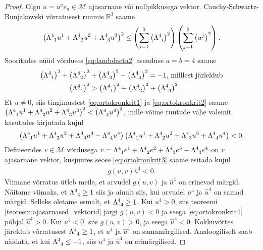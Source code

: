 \documentclass[a4paper,12pt]{article}
\theoremstyle{plain}
\theoremstyle{definition}
\numberwithin{equation}{section}
\begin{document}
\begin{proof}
Olgu $u = u^a e_a \in \mathcal{M}$ ajasarnane või nullpikkusega vektor. Cauchy-Schwartz-Bunjakowski võrratusest ruumis $\mathbb{R}^{3}$ saame
\begin{align} \label{eq:ortokronkrit1}
\left(\Lambda\indices{^4_1} u^1 + \Lambda\indices{^4_2} u^2 + \Lambda\indices{^4_3} u^3\right)^2 \leq \left(\sum_{i = 1}^{3} \left(\Lambda\indices{^4_i}\right)^2 \right) \left(\sum_{j = 1}^{3} \left(u^j\right)^2 \right).
\end{align}
Sooritades nüüd võrduses \ref{eq:lambdaeta2} asenduse $a = b = 4$ saame
\begin{align} \label{eq:ortokronkrit2}
\left(\Lambda\indices{^4_1}\right)^2 + \left(\Lambda\indices{^4_2}\right)^2 &+ \left(\Lambda\indices{^4_3}\right)^2 - \left(\Lambda\indices{^4_4}\right)^2 = -1 \text{, milllest järleldub} \nonumber \\
\left(\Lambda\indices{^4_4}\right)^2 &> \left(\Lambda\indices{^4_1}\right)^2 + \left(\Lambda\indices{^4_2}\right)^2 + \left(\Lambda\indices{^4_3}\right)^2.
\end{align}
Et $u \neq 0$, siis tingimustest \ref{eq:ortokronkrit1} ja \ref{eq:ortokronkrit2} saame $\left(\Lambda\indices{^4_1} u^1 + \Lambda\indices{^4_2} u^2 + \Lambda\indices{^4_3} u^3\right)^2 < \left(\Lambda\indices{^4_4} u^4\right)^2$, mille võime ruutude vahe valemit kasutades kirjutada kujul
\begin{align} \label{eq:ortokronkrit3}
\left(\Lambda\indices{^4_1} u^1 + \Lambda\indices{^4_2} u^2 + \Lambda\indices{^4_3} u^3 - \Lambda\indices{^4_4} u^4\right)\left(\Lambda\indices{^4_1} u^1 + \Lambda\indices{^4_2} u^2 + \Lambda\indices{^4_3} u^3 + \Lambda\indices{^4_4} u^4\right) < 0.
\end{align}
Defineerides $v \in \mathcal{M}$ võrdusega $v = \Lambda\indices{^4_1} e^1 + \Lambda\indices{^4_2} e^2 + \Lambda\indices{^4_3} e^3 - \Lambda\indices{^4_4} e^4$ on $v$ ajasarnane vektor, kusjuures seose \ref{eq:ortokronkrit3} saame esitada kujul
\begin{align} \label{eq:ortokronkrit4}
g\left(u , v\right)\hat{u}^4 < 0.
\end{align}
Viimane võrratus ütleb meile, et arvudel $g\left(u,v\right)$ ja $\hat{u}^4$ on erinevad märgid.
Näitame viimaks, et $\Lambda\indices{^4_4} \geq 1$ siis ja ainult siis, kui arvudel $u^4$ ja $\hat{u}^4$ on samad märgid.
Selleks oletame esmalt, et $\Lambda\indices{^4_4} \geq 1$. Kui $u^4 > 0$, siis teoreemi \ref{teoreem:ajasarnased_vektorid} järgi $g\left(u, v\right) < 0$ ja seega \ref{eq:ortokronkrit4} põhjal $\hat{u}^4 >0$. Kui $u^4 < 0$, siis $g\left(u, v\right) > 0$, ja seega $\hat{u}^4 < 0$. Kokkuvõttes järeldub võrratusest $\Lambda\indices{^4_4} \geq 1$, et $u^4$ ja $\hat{u}^4$ on samamärgilised. Analoogiliselt saab näidata, et kui $\Lambda\indices{^4_4} \leq -1$, siis $u^4$ ja $\hat{u}^4$ on erimärgilised.
\end{proof}
\end{document}
